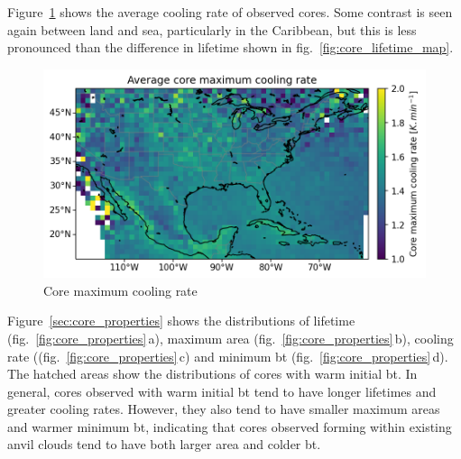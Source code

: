 Figure~\ref{fig:core_cooling_rate_map} shows the average cooling rate of observed cores.
Some contrast is seen again between land and sea, particularly in the Caribbean, but this is less pronounced than the difference in lifetime shown in fig.~\ref{fig:core_lifetime_map}.

\begin{figure}[tp]
    \centering
    \includegraphics[width=\textwidth]{figures/ch2_08.png}
    \caption{Core maximum cooling rate}
    \label{fig:core_cooling_rate_map}
\end{figure}

Figure~\ref{sec:core_properties} shows the distributions of lifetime (fig.~\ref{fig:core_properties}\,a), maximum area (fig.~\ref{fig:core_properties}\,b), cooling rate ((fig.~\ref{fig:core_properties}\,c) and minimum \acrshort{bt} (fig.~\ref{fig:core_properties}\,d).
The hatched areas show the distributions of cores with warm initial \acrshort{bt}.
In general, cores observed with warm initial \acrshort{bt} tend to have longer lifetimes and greater cooling rates.
However, they also tend to have smaller maximum areas and warmer minimum \acrshort{bt}, indicating that cores observed forming within existing anvil clouds tend to have both larger area and colder \acrshort{bt}.

